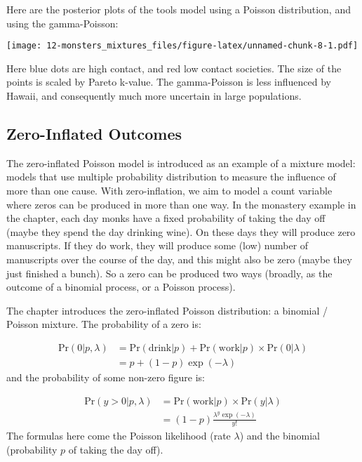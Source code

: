 \documentclass[
]{book}
\begin{document}
Here are the posterior plots of the tools model using a Poisson distribution, and using the gamma-Poisson:

\texttt{[image: 12-monsters\_mixtures\_files/figure-latex/unnamed-chunk-8-1.pdf]}

Here blue dots are high contact, and red low contact societies. The size of the points is scaled by Pareto k-value. The gamma-Poisson is less influenced by Hawaii, and consequently much more uncertain in large populations.

\hypertarget{zero-inflated-outcomes}{%
\subsection*{Zero-Inflated Outcomes}\label{zero-inflated-outcomes}}

The zero-inflated Poisson model is introduced as an example of a mixture model: models that use multiple probability distribution to measure the influence of more than one cause. With zero-inflation, we aim to model a count variable where zeros can be produced in more than one way. In the monastery example in the chapter, each day monks have a fixed probability of taking the day off (maybe they spend the day drinking wine). On these days they will produce zero manuscripts. If they do work, they will produce some (low) number of manuscripts over the course of the day, and this might also be zero (maybe they just finished a bunch). So a zero can be produced two ways (broadly, as the outcome of a binomial process, or a Poisson process).

The chapter introduces the zero-inflated Poisson distribution: a binomial / Poisson mixture. The probability of a zero is:

\[
\begin{aligned}
\text{Pr}(0|p,\lambda) & = \text{Pr}(\text{drink}|p) + \text{Pr}(\text{work}|p) \times \text{Pr}(0|\lambda) \\
&= p + (1-p)\exp(-\lambda)
\end{aligned}
\]
and the probability of some non-zero figure is:

\[
\begin{aligned}
\text{Pr}(y > 0|p,\lambda) & = \text{Pr}(\text{work}|p) \times \text{Pr}(y|\lambda) \\
&= (1-p)\frac{\lambda^y \exp(-\lambda)}{y!}
\end{aligned}
\]
The formulas here come the Poisson likelihood (rate \(\lambda\)) and the binomial (probability \(p\) of taking the day off).
\end{document}
